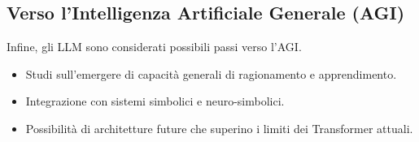 \subsection{Verso l'Intelligenza Artificiale Generale (AGI)}
Infine, gli LLM sono considerati possibili passi verso l'AGI.
\begin{itemize}
    \item Studi sull'emergere di capacità generali di ragionamento e apprendimento.
    \item Integrazione con sistemi simbolici e neuro-simbolici.
    \item Possibilità di architetture future che superino i limiti dei Transformer attuali.
\end{itemize}